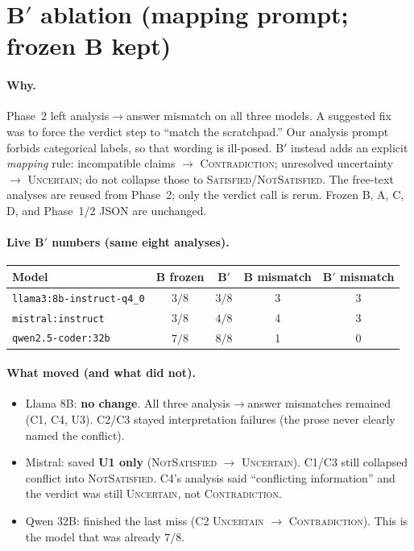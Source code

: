\documentclass[11pt,a4paper]{article}
\newcommand{\sat}{\textsc{Satisfied}}
\newcommand{\nsat}{\textsc{NotSatisfied}}
\newcommand{\unc}{\textsc{Uncertain}}
\newcommand{\con}{\textsc{Contradiction}}
\begin{document}
\section{B$'$ ablation (mapping prompt; frozen B kept)}

\paragraph{Why.}
Phase~2 left analysis$\rightarrow$answer mismatch on all three models.
A suggested fix was to force the verdict step to ``match the scratchpad.''
Our analysis prompt forbids categorical labels, so that wording is ill-posed.
B$'$ instead adds an explicit \emph{mapping} rule: incompatible claims $\rightarrow$ \con{}; unresolved uncertainty $\rightarrow$ \unc{}; do not collapse those to \sat{}/\nsat{}.
The free-text analyses are reused from Phase~2; only the verdict call is rerun.
Frozen B, A, C, D, and Phase~1/2 JSON are unchanged.

\paragraph{Live B$'$ numbers (same eight analyses).}
\begin{center}
\begin{tabular}{lcccc}
\toprule
Model & B frozen & B$'$ & B mismatch & B$'$ mismatch \\
\midrule
\texttt{llama3:8b-instruct-q4\_0} & $3/8$ & $3/8$ & 3 & 3 \\
\texttt{mistral:instruct} & $3/8$ & $4/8$ & 4 & 3 \\
\texttt{qwen2.5-coder:32b} & $7/8$ & $8/8$ & 1 & 0 \\
\bottomrule
\end{tabular}
\end{center}

\paragraph{What moved (and what did not).}
\begin{itemize}
  \item Llama 8B: \textbf{no change}. All three analysis$\rightarrow$answer mismatches remained (C1, C4, U3). C2/C3 stayed interpretation failures (the prose never clearly named the conflict).
  \item Mistral: saved \textbf{U1 only} (\nsat{} $\rightarrow$ \unc{}). C1/C3 still collapsed conflict into \nsat{}. C4's analysis said ``conflicting information'' and the verdict was still \unc{}, not \con{}.
  \item Qwen 32B: finished the last miss (C2 \unc{} $\rightarrow$ \con{}). This is the model that was already $7/8$.
\end{itemize}
\end{document}
